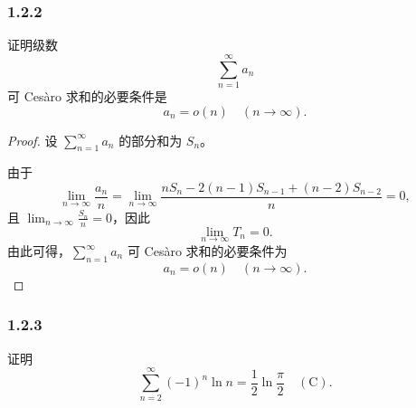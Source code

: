 \documentclass[12pt]{ctexart}
\begin{document}
\subsubsection*{1.2.2}
证明级数
\[
\sum_{n=1}^\infty a_n
\]
可 Cesàro 求和的必要条件是
\[
a_n = o(n) \quad (n \to \infty).
\]
\begin{proof}
设 $\sum_{n=1}^\infty a_n$ 的部分和为 $S_n$。

由于
\[
\lim_{n \to \infty} \frac{a_n}{n} = \lim_{n \to \infty} \frac{nS_n - 2(n-1)S_{n-1} + (n-2)S_{n-2}}{n} = 0,
\]
且 $\lim_{n \to \infty} \frac{S_n}{n} = 0$，因此
\[
\lim_{n \to \infty} T_n = 0.
\]
由此可得，$\sum_{n=1}^\infty a_n$ 可 Cesàro 求和的必要条件为
\[
a_n = o(n) \quad (n \to \infty).
\]
\end{proof}

\subsubsection*{1.2.3}
证明
\[
\sum_{n=2}^\infty (-1)^n \ln n = \frac{1}{2} \ln \frac{\pi}{2} \quad (\text{C}).
\]
\end{document}
